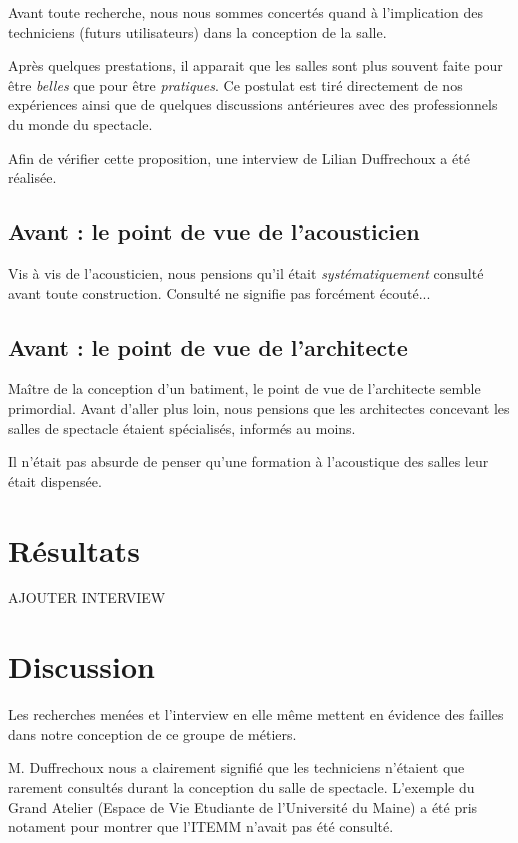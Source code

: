 \documentclass[a4paper, 11pt]{report}
\begin{document}
Avant toute recherche, nous nous sommes concertés quand à l'implication des techniciens (futurs utilisateurs) dans la conception de la salle.

Après quelques prestations, il apparait que les salles sont plus souvent faite pour être {\em belles} que pour être {\em pratiques}.
Ce postulat est tiré directement de nos expériences ainsi que de quelques discussions antérieures avec des professionnels du monde du spectacle.

Afin de vérifier cette proposition, une interview de Lilian Duffrechoux a été réalisée.

\subsection{Avant : le point de vue de l'acousticien}

Vis à vis de l'acousticien, nous pensions qu'il était {\em systématiquement} consulté avant toute construction.
Consulté ne signifie pas forcément écouté...

\subsection{Avant : le point de vue de l'architecte}

Maître de la conception d'un batiment, le point de vue de l'architecte semble primordial.
Avant d'aller plus loin, nous pensions que les architectes concevant les salles de spectacle étaient spécialisés, informés au moins.

Il n'était pas absurde de penser qu'une formation à l'acoustique des salles leur était dispensée.

\section{Résultats}

AJOUTER INTERVIEW

\section{Discussion}

Les recherches menées et l'interview en elle même mettent en évidence des failles dans notre conception de ce groupe de métiers.

M. Duffrechoux nous a clairement signifié que les techniciens n'étaient que rarement consultés durant la conception du salle de spectacle.
L'exemple du Grand Atelier (Espace de Vie Etudiante de l'Université du Maine) a été pris notament pour montrer que  l'ITEMM n'avait pas été consulté.
\end{document}

